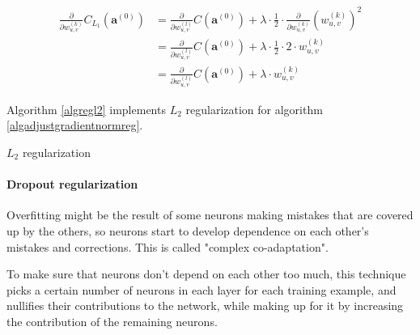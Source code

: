 \documentclass{article}
\begin{document}
            \begin{equation}
              \begin{split}
                \frac{\partial}{\partial w_{u,v}^{(k)}}
                  C_{L_1} \left( \mathbf{a}^{(0)} \right)
                    & = \frac{\partial}{\partial w_{u,v}^{(l)}}
                          C \left( \mathbf{a}^{(0)} \right)
                        +
                        \lambda
                        \cdot
                        \frac{1}{2}
                        \cdot
                        \frac{\partial}{\partial w_{u,v}^{(k)}}
                          \left( w_{u,v}^{(k)} \right)^2 \\
                    & = \frac{\partial}{\partial w_{u,v}^{(l)}}
                          C \left( \mathbf{a}^{(0)} \right)
                        +
                        \lambda \cdot \frac{1}{2} \cdot 2 \cdot w_{u,v}^{(k)} \\
                    & = \frac{\partial}{\partial w_{u,v}^{(l)}}
                          C \left( \mathbf{a}^{(0)} \right)
                        +
                        \lambda \cdot w_{u,v}^{(k)}
              \end{split}
            \end{equation}

            Algorithm \ref{algregl2} implements $L_2$ regularization for
            algorithm \ref{algadjustgradientnormreg}.

            \begin{algorithm}
              \caption{$L_2$ regularization} \label{algregl2}
              \begin{algorithmic}
                  \State {}
                \EndFunction
              \end{algorithmic}
            \end{algorithm}

        \paragraph{Dropout regularization}

          Overfitting might be the result of some neurons making mistakes that
          are covered up by the others, so neurons start to develop dependence
          on each other's mistakes and corrections. This is called "complex
          co-adaptation".

          To make sure that neurons don't depend on each other too much, this
          technique picks a certain number of neurons in each layer for each
          training example, and nullifies their contributions to the network,
          while making up for it by increasing the contribution of the
          remaining neurons.
\end{document}

